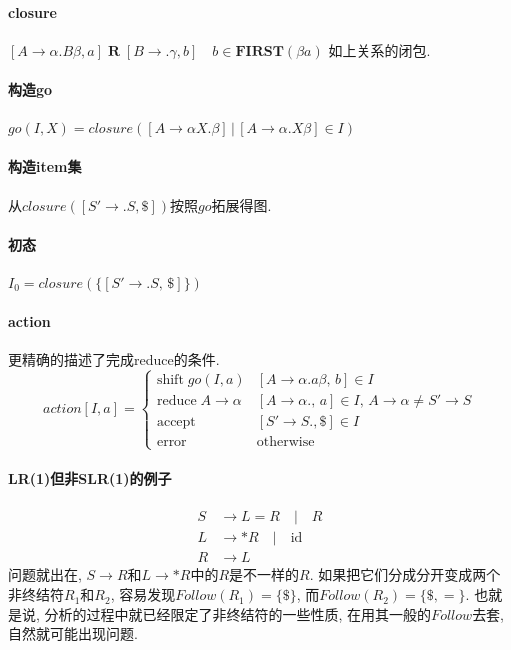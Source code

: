 \documentclass{ctexart}
\begin{document}
\paragraph{closure} $[A \to \alpha . B \beta, a]  \; \mathbf{R} \;  [B \to .\gamma, b] \quad b \in \mathbf{FIRST}(\beta a)$
    如上关系的闭包.
\paragraph{构造go} $go(I, X) = closure([A \to \alpha X. \beta] \,|\, [A \to \alpha . X \beta] \in I)$
\paragraph{构造item集} 从$closure([S' \to .S, \$])$按照$go$拓展得图.
\paragraph{初态} $I_0 = closure(\{[S' \to .S,\, \$]\})$
\paragraph{action} 更精确的描述了完成reduce的条件.
%
%
    \[ action[I, a] = \begin{cases}
        \text{shift}\; go(I, a)    & [A \to \alpha .a \beta,\, b] \in I\\
        \text{reduce}\; A\to\alpha & [A \to \alpha.,\, a] \in I,\, A\to\alpha \neq S'\to S\\
        \text{accept}              & [S' \to S., \$] \in I\\
        \text{error}               & \text{otherwise}\end{cases} \]
\paragraph{LR(1)但非SLR(1)的例子} \begin{align*}
        S &\to L = R \quad | \quad R\\
        L &\to *R \quad | \quad \text{id}\\
        R &\to L
    \end{align*}问题就出在, $S\to R$和$L \to *R$中的$R$是不一样的$R$.
    如果把它们分成分开变成两个非终结符$R_1$和$R_2$, 容易发现$Follow(R_1) = \{\$\}$,
    而$Follow(R_2) = \{ \$, = \}$. 也就是说, 分析的过程中就已经限定了非终结符的一些性质,
    在用其一般的$Follow$去套, 自然就可能出现问题.
\end{document}
